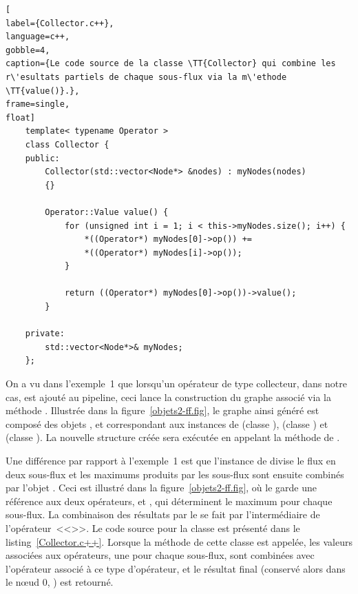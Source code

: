 \begin{lstlisting}[
label={Collector.c++},
language=c++,
gobble=4,
caption={Le code source de la classe \TT{Collector} qui combine les r\'esultats partiels de chaque sous-flux via la m\'ethode \TT{value()}.},
frame=single,
float]
    template< typename Operator >
    class Collector {
    public:
        Collector(std::vector<Node*> &nodes) : myNodes(nodes)
        {}
        
        Operator::Value value() {
            for (unsigned int i = 1; i < this->myNodes.size(); i++) {
                *((Operator*) myNodes[0]->op()) += 
                *((Operator*) myNodes[i]->op());
            }

            return ((Operator*) myNodes[0]->op())->value();
        }

    private:
        std::vector<Node*>& myNodes;
    };
\end{lstlisting}


On a vu dans l'exemple~1 que lorsqu'un op\'erateur de type collecteur,  dans notre cas, est ajout\'e au {pipeline}, ceci lance la construction du graphe  associ\'e via la m\'ethode . Illustr\'ee dans la figure~\ref{objets2-ff.fig}, le graphe ainsi g\'en\'er\'e est compos\'e des objets ,  et  correspondant aux instances de   (classe ),  (classe ) et  (classe ). La nouvelle structure cr\'e\'ee sera ex\'ecut\'ee en appelant la m\'ethode  de . 

Une différence par rapport \`a l'exemple~1 est que l'instance de  divise le flux en deux sous-flux et les maximums produits par les sous-flux sont ensuite combin\'es par l'objet . Ceci est illustr\'e dans la figure~\ref{objets2-ff.fig}, o\`u le  garde une r\'ef\'erence aux deux op\'erateurs,  et , qui d\'eterminent le maximum pour chaque sous-flux. La combinaison des r\'esultats par le  se fait par l'interm\'ediaire de l'opérateur~<<\TT{+=()}>>. Le code source pour la classe  est pr\'esent\'e dans le listing~\ref{Collector.c++}. Lorsque la m\'ethode  de cette classe est appel\'ee, les valeurs associées aux op\'erateurs, une pour chaque sous-flux, sont combin\'ees avec l'opérateur \TT{+=()} associé à ce type d'opérateur, et le r\'esultat final (conservé alors dans le n\oe{}ud 0, ) est retourn\'e.




